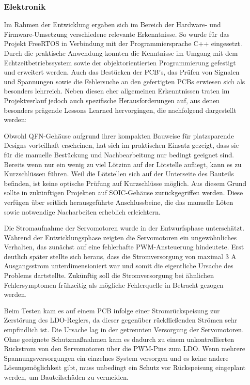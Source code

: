 \documentclass[main.tex]{subfiles} %
\begin{document}
\subsubsection{Elektronik}
Im Rahmen der Entwicklung ergaben sich im Bereich der Hardware- und
Firmware-Umsetzung verschiedene relevante
Erkenntnisse. So wurde für das Projekt FreeRTOS in Verbindung mit der
Programmiersprache C++ eingesetzt. Durch
die praktische Anwendung konnten die Kenntnisse im Umgang mit dem
Echtzeitbetriebssystem sowie der objektorientierten
Programmierung gefestigt und erweitert werden. Auch das Bestücken der
PCB's, das Prüfen von Signalen
und Spannungen sowie die Fehlersuche an den gefertigten PCBs erwiesen
sich als besonders lehrreich.
Neben diesen eher allgemeinen Erkenntnissen traten im Projektverlauf
jedoch auch spezifische Herausforderungen auf,
aus denen besonders prägende Lessons Learned hervorgingen, die
nachfolgend dargestellt werden:

Obwohl QFN-Gehäuse aufgrund ihrer kompakten Bauweise für platzsparende Designs
vorteilhaft erscheinen, hat sich im praktischen Einsatz gezeigt, dass
sie für die manuelle Bestückung
und Nachbearbeitung nur bedingt geeignet sind. Bereits wenn nur ein
wenig zu viel Lötzinn auf der
Lötstelle aufliegt, kann es zu Kurzschlüssen führen. Weil die
Lötstellen sich auf der Unterseite des
Bauteils befinden, ist keine optische Prüfung auf Kurzschlüsse
möglich. Aus diesem Grund sollte in
zukünftigen Projekten auf SOIC-Gehäuse zurückgegriffen werden. Diese
verfügen über
seitlich herausgeführte Anschlussbeine, die das manuelle Löten sowie
notwendige Nacharbeiten erheblich erleichtern.

Die Stromaufnahme der Servomotoren wurde in der Entwurfsphase unterschätzt.
Während der Entwicklungsphase zeigten die Servomotoren ein
ungewöhnliches Verhalten, das zunächst auf eine
fehlerhafte PWM-Ansteuerung hindeutete. Erst deutlich später stellte
sich heraus, dass die Stromversorgung von
maximal 3 A Ausgangsstrom unterdimensioniert war und somit die
eigentliche Ursache des Problems dartstellte.
Zukünftig soll die Stromversorgung bei ähnlichen Fehlersymptomen
frühzeitig als mögliche Fehlerquelle in Betracht
gezogen werden.

Beim Testen kam es auf einem PCB infolge einer Stromrückspeisung zur
Zerstörung des LDO-Reglers, da dieser gegenüber
rückfließenden Strömen sehr empfindlich ist. Die Ursache lag in der
getrennten Versorgung der Servomotoren.
Ohne geeignete Schutzmaßnahmen kam es dadurch zu einem
unkontrollierten Rückstrom von den Servomotoren über die
PWM-Pins zum LDO. Wenn mehrere Spannungsversorgungen ein einzelnes
System versorgen und es keine andere
Lösungsmöglichkeit gibt, muss unbedingt ein Schutz vor Rückspeisung
eingeplant werden, um Bauteilschäden zu vermeiden.
\end{document}
